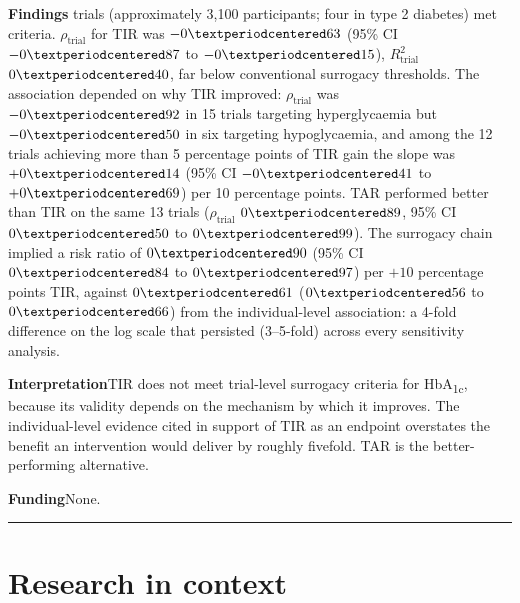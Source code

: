 \documentclass[11pt,a4paper]{article}
\newcommand{\pp}{percentage points}
\begin{document}
\noindent\textbf{Findings} trials (approximately 3,100 participants; four in type 2 diabetes)
met criteria. $\rho_{\mathrm{trial}}$ for TIR was $-0\textperiodcentered63$ (95\% CI $-0\textperiodcentered87$
to $-0\textperiodcentered15$), $R^2_{\mathrm{trial}}$ $0\textperiodcentered40$, far below conventional
surrogacy thresholds. The association depended on why TIR improved: $\rho_{\mathrm{trial}}$ was
$-0\textperiodcentered92$ in 15 trials targeting hyperglycaemia but $-0\textperiodcentered50$ in six
targeting hypoglycaemia, and among the 12 trials achieving more than 5 \pp{} of TIR gain the slope was
$+0\textperiodcentered14$ (95\% CI $-0\textperiodcentered41$ to $+0\textperiodcentered69$) per 10 \pp.
TAR performed better than TIR on the same 13 trials ($\rho_{\mathrm{trial}}$ $0\textperiodcentered89$,
95\% CI $0\textperiodcentered50$ to $0\textperiodcentered99$). The surrogacy chain implied a risk ratio
of $0\textperiodcentered90$ (95\% CI $0\textperiodcentered84$ to $0\textperiodcentered97$) per $+10$ \pp{}
TIR, against $0\textperiodcentered61$ ($0\textperiodcentered56$ to $0\textperiodcentered66$) from the
individual-level association: a 4-fold difference on the log scale that persisted
(3--5-fold) across every sensitivity analysis.

\noindent\textbf{Interpretation}\quad TIR does not meet trial-level surrogacy criteria for
HbA\textsubscript{1c}, because its validity depends on the mechanism by which it improves. The
individual-level evidence cited in support of TIR as an endpoint overstates the benefit an intervention
would deliver by roughly fivefold. TAR is the better-performing alternative.

\noindent\textbf{Funding}\quad None.

\vspace{1em}
\hrule
\vspace{1em}

\section*{Research in context}
\end{document}
